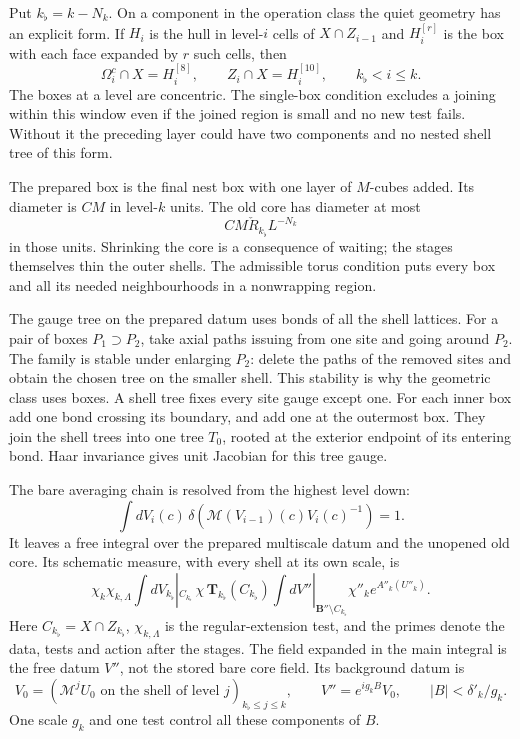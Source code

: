 \documentclass[11pt,letterpaper,reqno]{amsart}
\theoremstyle{definition}
\theoremstyle{remark}
\begin{document}
Put $k_\flat=k-N_k$. On a component in the
operation class the quiet geometry has an
explicit form. If $H_i$ is the hull in
level-$i$ cells of $X\cap Z_{i-1}$ and
$H_i^{[r]}$ is the box with each face
expanded by $r$ such cells, then
\begin{equation}\label{eq:xrg-quiet-boxes}
 \Omega_i^c\cap X=H_i^{[8]},\qquad
 Z_i\cap X=H_i^{[10]},
                       \qquad k_\flat<i\le k.
\end{equation}
The boxes at a level are concentric. The
single-box condition excludes a joining
within this window even if the joined
region is small and no new test fails.
Without it the preceding layer could
have two components and no nested shell
tree of this form.

The prepared box is the final nest box
with one layer of $M$-cubes added. Its
diameter is $CM$ in level-$k$ units.
The old core has diameter at most
\[
 CM\check R_{k_\flat}L^{-N_k}
\]
in those units. Shrinking the core is a
consequence of waiting; the stages
themselves thin the outer shells.
The admissible torus condition puts
every box and all its needed
neighbourhoods in a nonwrapping region.

The gauge tree on the prepared datum
uses bonds of all the shell lattices.
For a pair of boxes $P_1\supset P_2$,
take axial paths issuing from one site
and going around $P_2$. The family is
stable under enlarging $P_2$: delete
the paths of the removed sites and
obtain the chosen tree on the smaller
shell. This stability is why the
geometric class uses boxes. A shell
tree fixes every site gauge except one.
For each inner box add one bond crossing
its boundary, and add one at the
outermost box. They join the shell
trees into one tree $T_0$, rooted at
the exterior endpoint of its entering
bond. Haar invariance gives unit
Jacobian for this tree gauge.

The bare averaging chain is resolved
from the highest level down:
\[
 \int dV_i(c)\,
  \delta(\mathcal M(V_{i-1})(c)V_i(c)^{-1})=1.
\]
It leaves a free integral over the
prepared multiscale datum and the
unopened old core. Its schematic
measure, with every shell at its own
scale, is
\begin{equation}\label{eq:xrg-prepared-integral}
 \chi_k\chi_{k,\Lambda}
 \int dV_{k_\flat}|_{C_{k_\flat}}\,
      \chi\,\mathbf T_{k_\flat}(C_{k_\flat})
 \int dV''|_{\mathbf B''\setminus C_{k_\flat}}
                      \chi''_k e^{A''_k(U''_k)}.
\end{equation}
Here $C_{k_\flat}=X\cap Z_{k_\flat}$,
$\chi_{k,\Lambda}$ is the regular-extension
test, and the primes denote the data,
tests and action after the stages.
The field expanded in the main integral
is the free datum $V''$, not the stored
bare core field.
Its background datum is
\[
 V_0=(\mathcal M^jU_0
                  \text{ on the shell of level }j)_{k_\flat\le j\le k},
 \qquad V''=e^{ig_kB}V_0,
 \qquad |B|<\delta'_k/g_k.
\]
One scale $g_k$ and one test control
all these components of $B$.
\end{document}
